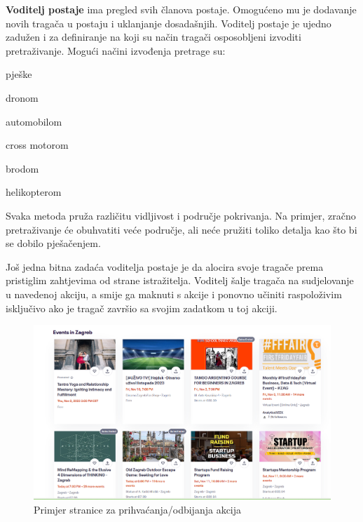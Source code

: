 		\textbf{Voditelj postaje} ima pregled svih članova postaje. Omogućeno mu je dodavanje novih tragača u postaju i uklanjanje dosadašnjih. Voditelj postaje je ujedno zadužen i za definiranje na koji su način tragači osposobljeni izvoditi pretraživanje. Mogući načini izvođenja pretrage su:
		
		\begin{packed_item}
			\item pješke
			\item dronom
			\item automobilom
			\item cross motorom
			\item brodom
			\item helikopterom
		\end{packed_item}
		
		Svaka metoda pruža različitu vidljivost i područje pokrivanja. Na primjer, zračno pretraživanje će obuhvatiti veće područje, ali neće pružiti toliko detalja kao što bi se dobilo pješačenjem.
		
		Još jedna bitna zadaća voditelja postaje je da alocira svoje tragače prema pristiglim zahtjevima od strane istražitelja. Voditelj šalje tragača na sudjelovanje u navedenoj akciju, a smije ga maknuti s akcije i ponovno učiniti raspoloživim isključivo ako je tragač završio sa svojim zadatkom u toj akciji.
		
		\begin{figure}[H]
			\includegraphics[scale=0.5]{slike/pr_biranja_akcija.PNG} %
			\centering
			\caption{Primjer stranice za prihvaćanja/odbijanja akcija}
			\label{fig:promjene}
		\end{figure}
		
